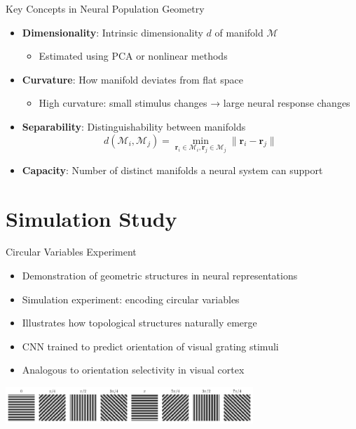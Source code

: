 \documentclass[aspectratio=169]{beamer}
\begin{document}
\begin{frame}{Key Concepts in Neural Population Geometry}
    \begin{itemize}
        \item \textbf{Dimensionality}: Intrinsic dimensionality $d$ of manifold $\mathcal{M}$
        \begin{itemize}
            \item Estimated using PCA or nonlinear methods
        \end{itemize}
        
        \item \textbf{Curvature}: How manifold deviates from flat space
        \begin{itemize}
            \item High curvature: small stimulus changes → large neural response changes
        \end{itemize}
        
        \item \textbf{Separability}: Distinguishability between manifolds
        \begin{equation}
        d(\mathcal{M}_i, \mathcal{M}_j) = \min_{\mathbf{r}_i \in \mathcal{M}_i, \mathbf{r}_j \in \mathcal{M}_j} \|\mathbf{r}_i - \mathbf{r}_j\|
        \end{equation}
        
        \item \textbf{Capacity}: Number of distinct manifolds a neural system can support
    \end{itemize}
\end{frame}

\section{Simulation Study}

\begin{frame}{Circular Variables Experiment}
    \begin{itemize}
        \item Demonstration of geometric structures in neural representations
        \item Simulation experiment: encoding circular variables
        \item Illustrates how topological structures naturally emerge
        \item CNN trained to predict orientation of visual grating stimuli
        \item Analogous to orientation selectivity in visual cortex
    \end{itemize}
    \includegraphics[width=0.7\textwidth]{results/grating_samples.pdf}
\end{frame}
\end{document}
